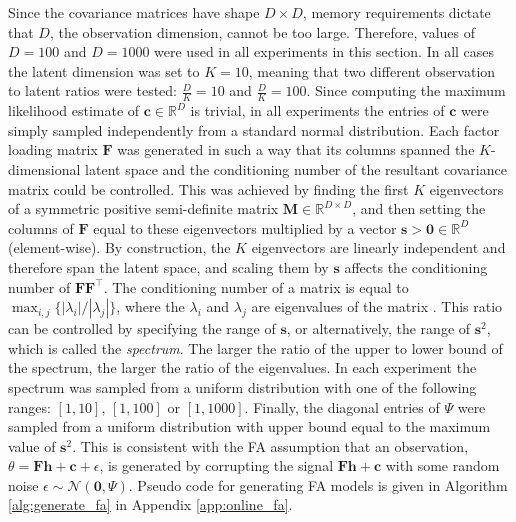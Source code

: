 \documentclass[msc,deptreport.inf]{infthesis} %
\newcommand{\matr}[1]{\mathbf{#1}}
\newcommand{\R}{\mathbb R}
\begin{document}
Since the covariance matrices have shape $D \times D$, memory requirements dictate that $D$, the observation dimension, cannot be too large. Therefore, values of $D=100$ and $D=1000$ were used in all experiments in this section. In all cases the latent dimension was set to $K=10$, meaning that two different observation to latent ratios were tested: $\frac{D}{K} = 10$ and $\frac{D}{K} = 100$. Since computing the maximum likelihood estimate of $\matr{c} \in \R^D$ is trivial, in all experiments the entries of $\matr{c}$ were simply sampled independently from a standard normal distribution. Each factor loading matrix $\matr{F}$ was generated in such a way that its columns spanned the $K$-dimensional latent space and the conditioning number of the resultant covariance matrix could be controlled. This was achieved by finding the first $K$ eigenvectors of a symmetric positive semi-definite matrix $\matr{M} \in \R^{D \times D}$, and then setting the columns of $\matr{F}$ equal to these eigenvectors multiplied by a vector $\matr{s} > \matr{0} \in \R^D$ (element-wise). By construction, the $K$ eigenvectors are linearly independent and therefore span the latent space, and scaling them by $\matr{s}$ affects the conditioning number of $\matr{F}\matr{F}^\intercal$. The conditioning number of a matrix is equal to $\max_{i, j} \{| \lambda_i | / | \lambda_j |\}$, where the $\lambda_i$ and $\lambda_j$ are eigenvalues of the matrix \cite{goodfellow2016}. This ratio can be controlled by specifying the  range of $\matr{s}$, or alternatively, the range of $\matr{s}^2$, which is called the \emph{spectrum}. The larger the ratio of the upper to lower bound of the spectrum, the larger the ratio of the eigenvalues. In each experiment the spectrum was sampled from a uniform distribution with one of the following ranges: $[1, 10]$, $[1, 100]$ or $[1, 1000]$. Finally, the diagonal entries of $\Psi$ were sampled from a uniform distribution with upper bound equal to the maximum value of $\matr{s}^2$. This is consistent with the FA assumption that an observation, $\theta = \matr{Fh} + \matr{c} + \epsilon$, is generated by corrupting the signal $\matr{Fh} + \matr{c}$ with some random noise $\epsilon \sim \mathcal{N}(\matr{0}, \Psi)$. Pseudo code for generating FA models is given in Algorithm \ref{alg:generate_fa} in Appendix \ref{app:online_fa}.
\end{document}
